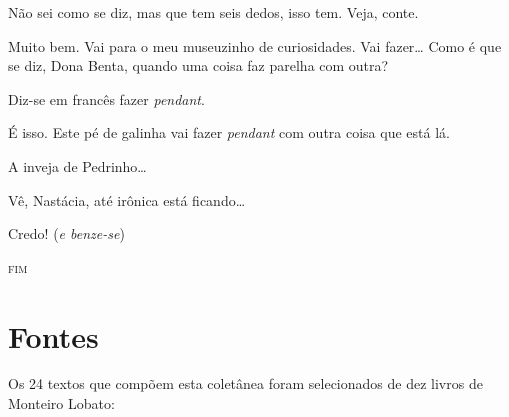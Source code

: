  Não sei como se diz, mas que tem seis dedos, isso tem.
Veja, conte.

  Muito
bem. Vai para o meu museuzinho de curiosidades. Vai fazer\ldots{} Como é
que se diz, Dona Benta, quando uma coisa faz parelha com outra?

 Diz-se em francês fazer \textit{pendant}.

 É isso. Este pé de galinha vai fazer \textit{pendant} com outra
coisa que está lá.


  A inveja de Pedrinho\ldots{}


 Vê, Nastácia, até irônica está ficando\ldots{}

 Credo! (\textit{e benze-se})

\begin{center}
\textsc{fim}
\end{center}



\chapter{Fontes}

Os 24 textos que compõem esta coletânea foram selecionados de dez livros de Monteiro Lobato:

